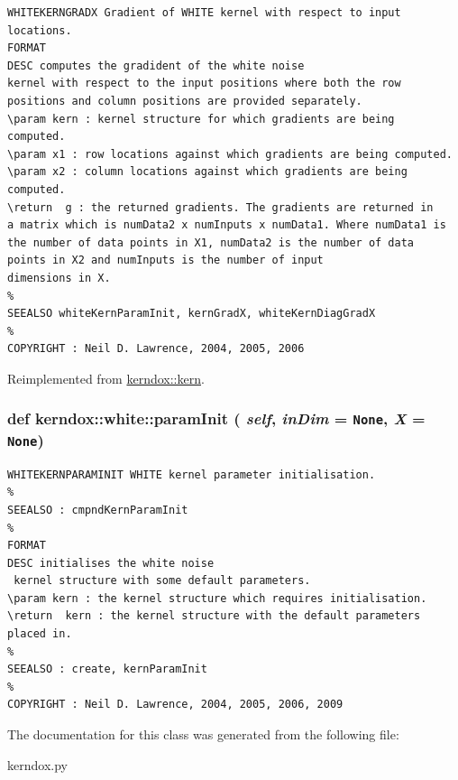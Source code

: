\footnotesize\begin{verbatim}WHITEKERNGRADX Gradient of WHITE kernel with respect to input locations.
FORMAT
DESC computes the gradident of the white noise
kernel with respect to the input positions where both the row
positions and column positions are provided separately.
\param kern : kernel structure for which gradients are being
computed.
\param x1 : row locations against which gradients are being computed.
\param x2 : column locations against which gradients are being computed.
\return  g : the returned gradients. The gradients are returned in
a matrix which is numData2 x numInputs x numData1. Where numData1 is
the number of data points in X1, numData2 is the number of data
points in X2 and numInputs is the number of input
dimensions in X.
%
SEEALSO whiteKernParamInit, kernGradX, whiteKernDiagGradX
%
COPYRIGHT : Neil D. Lawrence, 2004, 2005, 2006

\end{verbatim}
\normalsize
 

Reimplemented from \hyperlink{classkerndox_1_1kern}{kerndox::kern}.\hypertarget{classkerndox_1_1white_a20868e9e4488b9d80a70bf2e67b1438}{
\subsubsection[{paramInit}]{\setlength{\rightskip}{0pt plus 5cm}def kerndox::white::paramInit ( {\em self}, \/   {\em inDim} = {\tt None}, \/   {\em X} = {\tt None})}}
\label{classkerndox_1_1white_a20868e9e4488b9d80a70bf2e67b1438}




\footnotesize\begin{verbatim}WHITEKERNPARAMINIT WHITE kernel parameter initialisation.
%
SEEALSO : cmpndKernParamInit
%
FORMAT
DESC initialises the white noise
 kernel structure with some default parameters.
\param kern : the kernel structure which requires initialisation.
\return  kern : the kernel structure with the default parameters placed in.
%
SEEALSO : create, kernParamInit
%
COPYRIGHT : Neil D. Lawrence, 2004, 2005, 2006, 2009

\end{verbatim}
\normalsize
 

The documentation for this class was generated from the following file:\begin{CompactItemize}
\item 
kerndox.py\end{CompactItemize}
